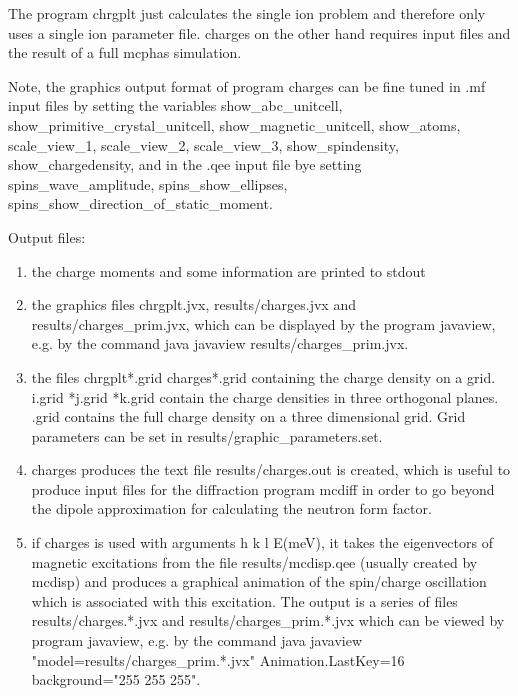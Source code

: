 The program {\prg chrgplt} just calculates the single ion
problem and therefore only uses a single ion parameter file.
{\prg charges} on the other hand requires input files and the result of a
full {\prg mcphas} simulation.

Note, the graphics output format of program {\prg charges} 
can be fine tuned in .mf input files by setting the variables
{\prg show\_abc\_unitcell, show\_primitive\_crystal\_unitcell, show\_magnetic\_unitcell, show\_atoms, %
scale\_view\_1,
scale\_view\_2, scale\_view\_3, show\_spindensity, show\_chargedensity}, and in
the  .qee input file bye setting {\prg spins\_wave\_amplitude, spins\_show\_ellipses, %
spins\_show\_direction\_of\_static\_moment}.


Output files:
\begin{enumerate}
  \item the charge moments and some information are printed to stdout 
  \item the graphics files {\prg chrgplt.jvx}, {\prg results/charges.jvx} and {\prg %
results/charges\_prim.jvx}, which can be displayed
         by the program {\prg javaview}, e.g. by the command {\prg java javaview results/charges\_prim.jvx}.
  \item the files {\prg chrgplt*.grid  charges*.grid} containing the charge density
on a grid. {\prg *i.grid *j.grid *k.grid} contain the charge densities
in three orthogonal planes. {\prg *.grid} contains the full charge density on a
three dimensional grid. Grid parameters can be set in {\prg results/graphic\_parameters.set}.
  \item {\prg charges} produces the text file {\prg results/charges.out} is created, which is useful to produce %
input files for
              the diffraction program {\prg mcdiff} in order to go beyond the dipole approximation
              for calculating the neutron form factor.
  \item if {\prg charges} is used with arguments {\prg h k l E(meV)}, it takes the eigenvectors of magnetic %
excitations
        from the file {\prg results/mcdisp.qee} (usually created by {\prg mcdisp}) and produces a graphical
        animation of the spin/charge oscillation which is associated with this excitation. The output is a series
        of files {\prg results/charges.*.jvx} and {\prg results/charges\_prim.*.jvx} which can be viewed by %
program
        {\prg javaview}, e.g. by the command {\prg java javaview "model=results/charges\_prim.*.jvx" 
        Animation.LastKey=16 background="255 255 255"}.
 \end{enumerate}


